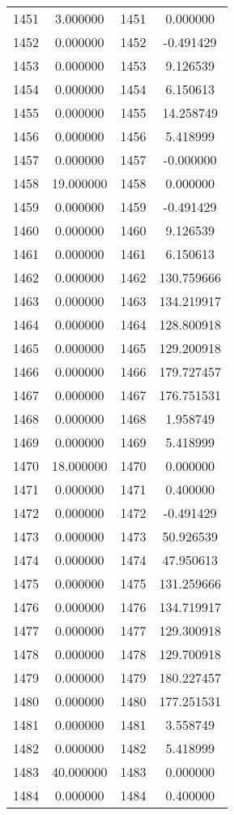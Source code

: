 \documentclass[12pt]{article}
\begin{document}
\begin{longtable}{@{}cccc@{}}
1451 & 3.000000 & 1451 & 0.000000 \\
1452 & 0.000000 & 1452 & -0.491429 \\
1453 & 0.000000 & 1453 & 9.126539 \\
1454 & 0.000000 & 1454 & 6.150613 \\
1455 & 0.000000 & 1455 & 14.258749 \\
1456 & 0.000000 & 1456 & 5.418999 \\
1457 & 0.000000 & 1457 & -0.000000 \\
1458 & 19.000000 & 1458 & 0.000000 \\
1459 & 0.000000 & 1459 & -0.491429 \\
1460 & 0.000000 & 1460 & 9.126539 \\
1461 & 0.000000 & 1461 & 6.150613 \\
1462 & 0.000000 & 1462 & 130.759666 \\
1463 & 0.000000 & 1463 & 134.219917 \\
1464 & 0.000000 & 1464 & 128.800918 \\
1465 & 0.000000 & 1465 & 129.200918 \\
1466 & 0.000000 & 1466 & 179.727457 \\
1467 & 0.000000 & 1467 & 176.751531 \\
1468 & 0.000000 & 1468 & 1.958749 \\
1469 & 0.000000 & 1469 & 5.418999 \\
1470 & 18.000000 & 1470 & 0.000000 \\
1471 & 0.000000 & 1471 & 0.400000 \\
1472 & 0.000000 & 1472 & -0.491429 \\
1473 & 0.000000 & 1473 & 50.926539 \\
1474 & 0.000000 & 1474 & 47.950613 \\
1475 & 0.000000 & 1475 & 131.259666 \\
1476 & 0.000000 & 1476 & 134.719917 \\
1477 & 0.000000 & 1477 & 129.300918 \\
1478 & 0.000000 & 1478 & 129.700918 \\
1479 & 0.000000 & 1479 & 180.227457 \\
1480 & 0.000000 & 1480 & 177.251531 \\
1481 & 0.000000 & 1481 & 3.558749 \\
1482 & 0.000000 & 1482 & 5.418999 \\
1483 & 40.000000 & 1483 & 0.000000 \\
1484 & 0.000000 & 1484 & 0.400000 \\

\end{longtable}
\end{document}
